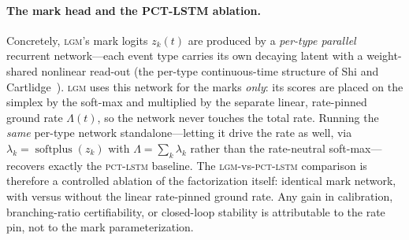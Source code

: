 \paragraph{The mark head and the PCT-LSTM ablation.}
Concretely, \textsc{lgm}'s mark logits $z_k(t)$ are produced by a \emph{per-type
parallel} recurrent network---each event type carries its own decaying latent with a
weight-shared nonlinear read-out (the per-type continuous-time structure of Shi and
Cartlidge~\cite{Shi2022StateSimulation}). \textsc{lgm} uses this network for the marks
\emph{only}: its scores are placed on the simplex by the soft-max and multiplied by the
separate linear, rate-pinned ground rate $\Lambda(t)$, so the network never touches the
total rate. Running the \emph{same} per-type network standalone---letting it drive the
rate as well, via $\lambda_k=\operatorname{softplus}(z_k)$ with
$\Lambda=\sum_k\lambda_k$ rather than the rate-neutral soft-max---recovers exactly the
\textsc{pct-lstm} baseline. The \textsc{lgm}-vs-\textsc{pct-lstm} comparison is therefore
a controlled ablation of the factorization itself: identical mark network, with versus
without the linear rate-pinned ground rate. Any gain in calibration, branching-ratio
certifiability, or closed-loop stability is attributable to the rate pin, not to the mark
parameterization.
